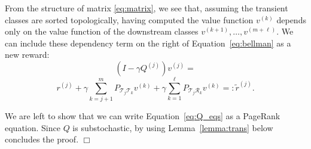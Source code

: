 \documentclass[letterpaper, 10 pt, conference]{ieeeconf}
\newcommand{\R}{\mathcal{R}}
\newcommand{\T}{\mathcal{T}}
\begin{document}
From the structure of matrix \eqref{eq:matrix}, we see that, assuming the transient classes are sorted topologically, having computed the value function $v^{(k)}$ depends only on the value function of the downstream classes $v^{(k+1)},\dots, v^{(m+\ell)}$. We can include these dependency term on the right of Equation~\eqref{eq:bellman} as a new reward: 
\[
(I-\gamma Q^{(j)})v^{(j)} =
\]
\begin{equation}
\label{eq:Q_eqs}
r^{(j)} + \gamma\sum_{k=j+1}^{m} P_{\T_j\T_k} v^{(k)} + \gamma\sum_{k=1}^{\ell} P_{\T_j\R_k} v^{(k)} =: \tilde r^{(j)}.
\end{equation}

We are left to show that we can write Equation~\eqref{eq:Q_eqs} as a PageRank equation. Since $Q$ is substochastic, by using Lemma~\ref{lemma:trans} below concludes the proof.
\hfill $\Box$

\end{document}
